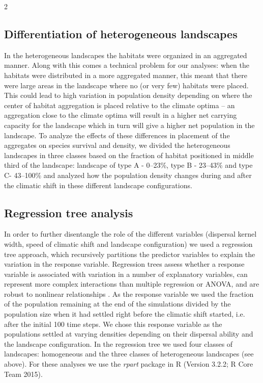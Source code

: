 \documentclass[12pt,pdftex]{article}
\begin{document}
\begin{spacing}{2}
\subsection*{Differentiation of heterogeneous landscapes}
In the heterogeneous landscapes the habitats were organized in an aggregated manner. Along with this comes a technical problem for our analyses: when the habitats were distributed in a more aggregated manner, this meant that there were large areas in the landscape where no (or very few) habitats were placed. This could lead to high variation in population density depending on where the center of  habitat aggregation is placed relative to the climate optima -- an aggregation close to the climate optima will result in a higher net carrying capacity for the landscape which in turn will give a higher net population in the landscape. 
To analyze the effects of these differences in placement of the aggregates on species survival and density, we divided the heterogeneous landscapes in three classes based on the fraction of habitat positioned in middle third of the landscape: landscape of type A - 0--23\%, type B - 23--43\%  and type C- 43--100\% and analyzed how the population density changes during and after the climatic shift in these different landscape configurations. 

\subsection*{Regression tree analysis} 

In order to further disentangle the role of the different variables (dispersal kernel width, speed of climatic shift and landscape configuration) we used a regression tree approach, which recursively partitions the predictor variables to explain the variation in the response variable. Regression trees assess whether a response variable is associated with variation in a number of explanatory variables, can represent more complex interactions than multiple regression or ANOVA, and are robust to nonlinear relationships \citep{Death2000, Brose2005a}. As the response variable we used the fraction of the population remaining at the end of the simulations divided by the population size when it had settled right before the climatic shift started, i.e. after the initial 100 time steps. We chose this response variable as the populations settled at varying densities depending on their dispersal ability and the landscape configuration. In the regression tree we used four classes of landscapes: homogeneous and the three classes of heterogeneous landscapes (see above). For these analyses we use the {\em rpart} package in \textsf{R} (Version 3.2.2; R Core Team 2015). 


\end{spacing}
\end{document}
